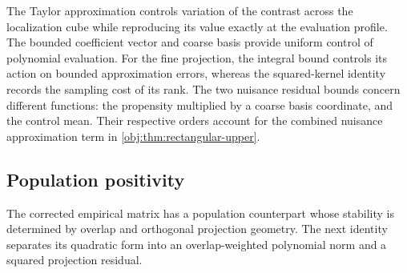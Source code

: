 \documentclass[11pt]{article}
\begin{document}
The Taylor approximation controls variation of the contrast across the localization cube while reproducing its value exactly at the evaluation profile. The bounded coefficient vector and coarse basis provide uniform control of polynomial evaluation. For the fine projection, the integral bound controls its action on bounded approximation errors, whereas the squared-kernel identity records the sampling cost of its rank. The two nuisance residual bounds concern different functions: the propensity multiplied by a coarse basis coordinate, and the control mean. Their respective orders account for the combined nuisance approximation term in \cref{obj:thm:rectangular-upper}.

\subsection{Population positivity}

The corrected empirical matrix has a population counterpart whose stability is determined by overlap and orthogonal projection geometry. The next identity separates its quadratic form into an overlap-weighted polynomial norm and a squared projection residual.
\end{document}

